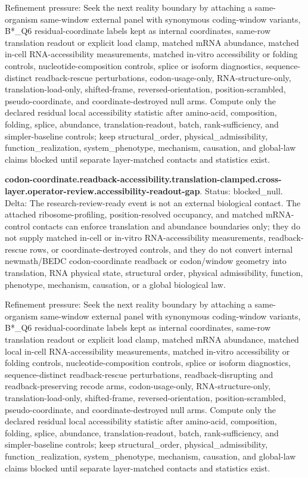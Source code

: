 Refinement pressure: Seek the next reality boundary by attaching a same-organism same-window external panel with synonymous coding-window variants, B*\_Q6 residual-coordinate labels kept as internal coordinates, same-row translation readout or explicit load clamp, matched mRNA abundance, matched in-cell RNA-accessibility measurements, matched in-vitro accessibility or folding controls, nucleotide-composition controls, splice or isoform diagnostics, sequence-distinct readback-rescue perturbations, codon-usage-only, RNA-structure-only, translation-load-only, shifted-frame, reversed-orientation, position-scrambled, pseudo-coordinate, and coordinate-destroyed null arms. Compute only the declared residual local accessibility statistic after amino-acid, composition, folding, splice, abundance, translation-readout, batch, rank-sufficiency, and simpler-baseline controls; keep structural\_order, physical\_admissibility, function\_realization, system\_phenotype, mechanism, causation, and global-law claims blocked until separate layer-matched contacts and statistics exist.

\textbf{codon-coordinate.readback-accessibility.translation-clamped.cross-layer.operator-review.accessibility-readout-gap}. Status: blocked\_null. Delta: The research-review-ready event is not an external biological contact. The attached ribosome-profiling, position-resolved occupancy, and matched mRNA-control contacts can enforce translation and abundance boundaries only; they do not supply matched in-cell or in-vitro RNA-accessibility measurements, readback-rescue rows, or coordinate-destroyed controls, and they do not convert internal newmath/BEDC codon-coordinate readback or codon/window geometry into translation, RNA physical state, structural order, physical admissibility, function, phenotype, mechanism, causation, or a global biological law.

Refinement pressure: Seek the next reality boundary by attaching a same-organism same-window external panel with synonymous coding-window variants, B*\_Q6 residual-coordinate labels kept as internal coordinates, same-row translation readout or explicit load clamp, matched mRNA abundance, matched local in-cell RNA-accessibility measurements, matched in-vitro accessibility or folding controls, nucleotide-composition controls, splice or isoform diagnostics, sequence-distinct readback-rescue perturbations, readback-disrupting and readback-preserving recode arms, codon-usage-only, RNA-structure-only, translation-load-only, shifted-frame, reversed-orientation, position-scrambled, pseudo-coordinate, and coordinate-destroyed null arms. Compute only the declared residual local accessibility statistic after amino-acid, composition, folding, splice, abundance, translation-readout, batch, rank-sufficiency, and simpler-baseline controls; keep structural\_order, physical\_admissibility, function\_realization, system\_phenotype, mechanism, causation, and global-law claims blocked until separate layer-matched contacts and statistics exist.


